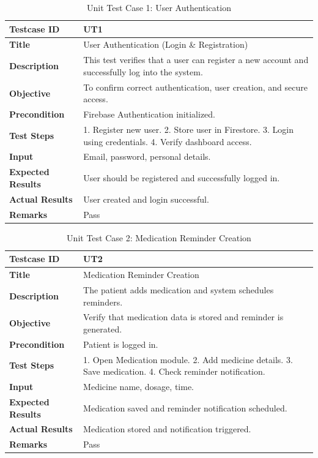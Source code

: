 
\begin{table}[H]
\centering
\caption{Unit Test Case 1: User Authentication}
\begin{tabularx}{\textwidth}{|l|X|}
\hline
\textbf{Testcase ID} & UT1 \\ \hline
\textbf{Title} & User Authentication (Login \& Registration) \\ \hline
\textbf{Description} & This test verifies that a user can register a new account and successfully log into the system. \\ \hline
\textbf{Objective} & To confirm correct authentication, user creation, and secure access. \\ \hline
\textbf{Precondition} & Firebase Authentication initialized. \\ \hline
\textbf{Test Steps} & 1. Register new user. 2. Store user in Firestore. 3. Login using credentials. 4. Verify dashboard access. \\ \hline
\textbf{Input} & Email, password, personal details. \\ \hline
\textbf{Expected Results} & User should be registered and successfully logged in. \\ \hline
\textbf{Actual Results} & User created and login successful. \\ \hline
\textbf{Remarks} & Pass \\ \hline
\end{tabularx}
\end{table}

\begin{table}[H]
\centering
\caption{Unit Test Case 2: Medication Reminder Creation}
\begin{tabularx}{\textwidth}{|l|X|}
\hline
\textbf{Testcase ID} & UT2 \\ \hline
\textbf{Title} & Medication Reminder Creation \\ \hline
\textbf{Description} & The patient adds medication and system schedules reminders. \\ \hline
\textbf{Objective} & Verify that medication data is stored and reminder is generated. \\ \hline
\textbf{Precondition} & Patient is logged in. \\ \hline
\textbf{Test Steps} & 1. Open Medication module. 2. Add medicine details. 3. Save medication. 4. Check reminder notification. \\ \hline
\textbf{Input} & Medicine name, dosage, time. \\ \hline
\textbf{Expected Results} & Medication saved and reminder notification scheduled. \\ \hline
\textbf{Actual Results} & Medication stored and notification triggered. \\ \hline
\textbf{Remarks} & Pass \\ \hline
\end{tabularx}
\end{table}

